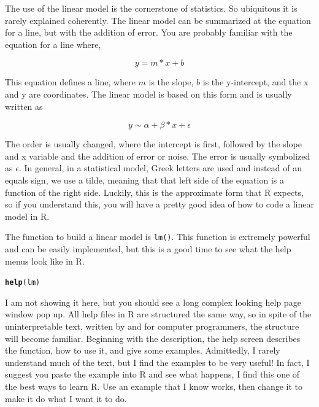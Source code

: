 \documentclass{article}\usepackage[]{graphicx}\usepackage[]{color}
\makeatletter
\newcommand{\hlstd}[1]{\textcolor[rgb]{0.345,0.345,0.345}{#1}}%
\newcommand{\hlkwd}[1]{\textcolor[rgb]{0.737,0.353,0.396}{\textbf{#1}}}%
\newenvironment{kframe}{%
 \def\at@end@of@kframe{}%
 \ifinner\ifhmode%
  \def\at@end@of@kframe{\end{minipage}}%
  \begin{minipage}{\columnwidth}%
 \fi\fi%
 \def\FrameCommand##1{\hskip\@totalleftmargin \hskip-\fboxsep
 \colorbox{shadecolor}{##1}\hskip-\fboxsep
     \hskip-\linewidth \hskip-\@totalleftmargin \hskip\columnwidth}%
 \MakeFramed {\advance\hsize-\width
   \@totalleftmargin\z@ \linewidth\hsize
   \@setminipage}}%
 {\par\unskip\endMakeFramed%
 \at@end@of@kframe}
\newenvironment{knitrout}{}{} %
\makeatother
\begin{document}
The use of the linear model is the cornerstone of statistics. So ubiquitous it is rarely explained coherently. The linear model can be summarized at the equation for a line, but with the addition of error. You are probably familiar with the equation for a line where, 

\begin{equation}
y = m * x + b
\end{equation}

This equation defines a line, where $m$ is the slope, $b$ is the y-intercept, and the x and y are coordinates. The linear model is based on this form and is usually written as  

\begin{equation}
y \sim \alpha + \beta * x + \epsilon
\end{equation}

The order is usually changed, where the intercept is first, followed by the slope and x variable and the addition of error or noise. The error is usually symbolized as $\epsilon$. In general, in a statistical model, Greek letters are used and instead of an equals sign, we use a tilde, meaning that that left side of the equation is a function of the right side. Luckily, this is the approximate form that R expects, so if you understand this, you will have a pretty good idea of how to code a linear model in R. 

The function to build a linear model is \texttt{lm()}. This function is extremely powerful and can be easily implemented, but this is a good time to see what the help menus look like in R. 

\begin{knitrout}
\color{fgcolor}\begin{kframe}
\begin{alltt}
\hlkwd{help}\hlstd{(lm)}
\end{alltt}
\end{kframe}
\end{knitrout}

I am not showing it here, but you should see a long complex looking help page window pop up. All help files in R are structured the same way, so in spite of the uninterpretable text, written by and for computer programmers, the structure will become familiar. Beginning with the description, the help screen describes the function, how to use it, and give some examples. Admittedly, I rarely understand much of the text, but I find the examples to be very useful! In fact, I suggest you paste the example into R and see what happens, I find this one of the best ways to learn R. Use an example that I know works, then change it to make it do what I want it to do.
\end{document}
